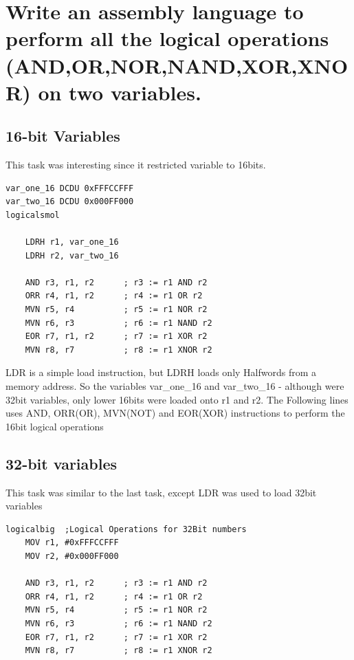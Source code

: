 \documentclass{article}
\begin{document}
\section{Write an assembly language to perform all the logical operations
(AND,OR,NOR,NAND,XOR,XNOR) on two variables.}
    \subsection{16-bit Variables}
        This task was interesting since it restricted variable to 16bits. 
        \begin{verbatim}
var_one_16 DCDU 0xFFFCCFFF
var_two_16 DCDU 0x000FF000
logicalsmol	
	
    LDRH r1, var_one_16
    LDRH r2, var_two_16
    	
    AND r3, r1, r2 		; r3 := r1 AND r2
    ORR r4, r1, r2		; r4 := r1 OR r2
    MVN r5, r4			; r5 := r1 NOR r2
    MVN r6, r3			; r6 := r1 NAND r2
    EOR r7, r1, r2		; r7 := r1 XOR r2
    MVN r8, r7			; r8 := r1 XNOR r2
        \end{verbatim}
        LDR is a simple load instruction, but LDRH loads only Halfwords from a memory address. So the variables var\_one\_16 and var\_two\_16 - although were 32bit variables, only lower 16bits were loaded onto r1 and r2.
        The Following lines uses AND, ORR(OR), MVN(NOT) and EOR(XOR) instructions to perform the 16bit logical operations
    \subsection{32-bit variables}
        This task was similar to the last task, except LDR was used to load 32bit variables
        \begin{verbatim}
logicalbig	;Logical Operations for 32Bit numbers
    MOV r1, #0xFFFCCFFF
    MOV r2, #0x000FF000
        	
    AND r3, r1, r2 		; r3 := r1 AND r2
    ORR r4, r1, r2		; r4 := r1 OR r2
    MVN r5, r4			; r5 := r1 NOR r2
    MVN r6, r3			; r6 := r1 NAND r2
    EOR r7, r1, r2		; r7 := r1 XOR r2
    MVN r8, r7			; r8 := r1 XNOR r2
        \end{verbatim}
\end{document}
